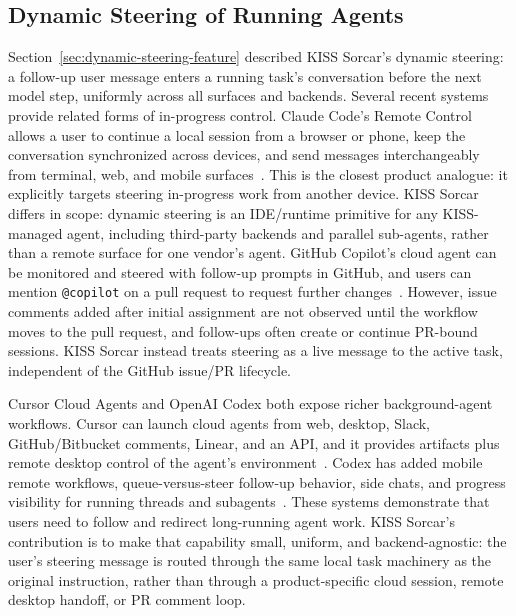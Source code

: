 \documentclass{article}
\begin{document}
\subsection{Dynamic Steering of Running Agents}
\label{sec:dynamic-steering}

Section~\ref{sec:dynamic-steering-feature} described KISS Sorcar's dynamic steering: a follow-up user message enters a running task's conversation before the next model step, uniformly across all surfaces and backends.  Several recent systems provide related forms of in-progress control.  Claude Code's Remote Control allows a user to continue a local session from a browser or phone, keep the conversation synchronized across devices, and send messages interchangeably from terminal, web, and mobile surfaces~\citep{anthropic2026remotecontrol}.  This is the closest product analogue: it explicitly targets steering in-progress work from another device.  KISS Sorcar differs in scope: dynamic steering is an IDE/runtime primitive for any KISS-managed agent, including third-party backends and parallel sub-agents, rather than a remote surface for one vendor's agent.  GitHub Copilot's cloud agent can be monitored and steered with follow-up prompts in GitHub, and users can mention \texttt{@copilot} on a pull request to request further changes~\citep{github2026copilotcloud}.  However, issue comments added after initial assignment are not observed until the workflow moves to the pull request, and follow-ups often create or continue PR-bound sessions.  KISS Sorcar instead treats steering as a live message to the active task, independent of the GitHub issue/PR lifecycle.

Cursor Cloud Agents and OpenAI Codex both expose richer background-agent workflows.  Cursor can launch cloud agents from web, desktop, Slack, GitHub/Bitbucket comments, Linear, and an API, and it provides artifacts plus remote desktop control of the agent's environment~\citep{cursor2026cloudagents}.  Codex has added mobile remote workflows, queue-versus-steer follow-up behavior, side chats, and progress visibility for running threads and subagents~\citep{openai2026codexchangelog}.  These systems demonstrate that users need to follow and redirect long-running agent work.  KISS Sorcar's contribution is to make that capability small, uniform, and backend-agnostic: the user's steering message is routed through the same local task machinery as the original instruction, rather than through a product-specific cloud session, remote desktop handoff, or PR comment loop.
\end{document}
